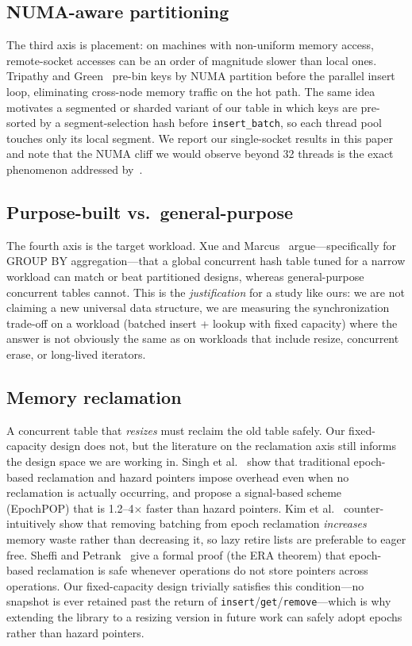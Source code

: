\documentclass[10pt,twocolumn]{article}
\begin{document}
\subsection{NUMA-aware partitioning}
The third axis is placement: on machines with non-uniform memory
access, remote-socket accesses can be an order of magnitude slower
than local ones. Tripathy and Green~\cite{tripathy2021numa} pre-bin
keys by NUMA partition before the parallel insert loop, eliminating
cross-node memory traffic on the hot path. The same idea motivates
a segmented or sharded variant of our table in which keys are
pre-sorted by a segment-selection hash before
\texttt{insert\_batch}, so each thread pool touches only its
local segment. We report our single-socket results in this paper
and note that the NUMA cliff we would observe beyond 32 threads is
the exact phenomenon addressed by~\cite{tripathy2021numa}.

\subsection{Purpose-built vs.\ general-purpose}
The fourth axis is the target workload. Xue and
Marcus~\cite{xue2025global} argue---specifically for GROUP BY
aggregation---that a global concurrent hash table tuned for a
narrow workload can match or beat partitioned designs, whereas
general-purpose concurrent tables cannot. This is the
\emph{justification} for a study like ours: we are not claiming a
new universal data structure, we are measuring the synchronization
trade-off on a workload (batched insert + lookup with fixed
capacity) where the answer is not obviously the same as on
workloads that include resize, concurrent erase, or long-lived
iterators.

\subsection{Memory reclamation}
A concurrent table that \emph{resizes} must reclaim the old table
safely. Our fixed-capacity design does not, but the literature on
the reclamation axis still informs the design space we are working
in. Singh et al.~\cite{singh2025pop} show that traditional
epoch-based reclamation and hazard pointers impose overhead even
when no reclamation is actually occurring, and propose a
signal-based scheme (EpochPOP) that is 1.2--4$\times$ faster than
hazard pointers. Kim et al.~\cite{kim2024epic} counter-intuitively
show that removing batching from epoch reclamation \emph{increases}
memory waste rather than decreasing it, so lazy retire lists are
preferable to eager free. Sheffi and Petrank~\cite{sheffi2022era}
give a formal proof (the ERA theorem) that epoch-based reclamation
is safe whenever operations do not store pointers across
operations. Our fixed-capacity design trivially satisfies this
condition---no snapshot is ever retained past the return of
\texttt{insert}/\texttt{get}/\texttt{remove}---which is why
extending the library to a resizing version in future work can
safely adopt epochs rather than hazard pointers.
\end{document}
